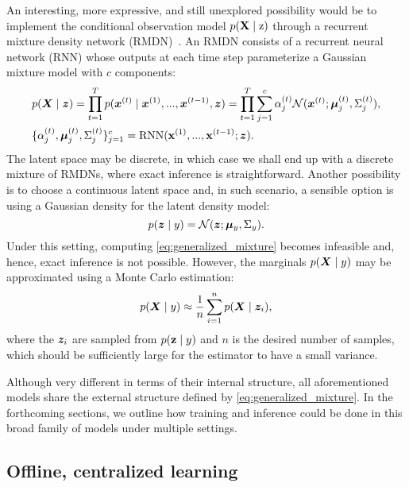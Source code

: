 An interesting, more expressive, and still unexplored possibility would be to implement the conditional observation model $p({\mathbf{X}} \mid {\textnormal{z}})$ through a recurrent mixture density network (RMDN)~\cite{Bishop1994, Graves2013, Bazzani2016}. An RMDN consists of a recurrent neural network (RNN) whose outputs at each time step parameterize a Gaussian mixture model with $c$ components:
\begin{align}
    & p({\bm{X}} \mid {\bm{z}}) = \prod_{t=1}^T p({\bm{x}}^{(t)} \mid {\bm{x}}^{(1)}, ..., {\bm{x}}^{(t-1)}, {\bm{z}}) = \prod_{t=1}^T \sum_{j=1}^c \alpha_j^{(t)} \mathcal{N}({\bm{x}}^{(t)} ; {\bm{\mu}}_j^{(t)}, \Sigma_j^{(t)}),\\
    & \lbrace \alpha_j^{(t)}, {\bm{\mu}}_j^{(t)}, \Sigma_j^{(t)} \rbrace_{j=1}^c = \text{RNN}({\mathbf{x}}^{(1)}, ..., {\mathbf{x}}^{(t-1)}; {\bm{z}}).
\end{align}
The latent space may be discrete, in which case we shall end up with a discrete mixture of RMDNs, where exact inference is straightforward. Another possibility is to choose a continuous latent space and, in such scenario, a sensible option is using a Gaussian density for the latent density model:
\begin{equation}
    p({\bm{z}} \mid y) = \mathcal{N}({\bm{z}} ; {\bm{\mu}}_y, \Sigma_y).
\end{equation}
Under this setting, computing \eqref{eq:generalized_mixture} becomes infeasible and, hence, exact inference is not possible. However, the marginals $p({\bm{X}} \mid y)$ may be approximated using a Monte Carlo estimation:
\begin{equation}
    p({\bm{X}} \mid y) \approx \frac{1}{n}\sum_{i=1}^n p({\bm{X}} \mid {\bm{z}}_i),
\end{equation}
where the ${\bm{z}}_i$ are sampled from $p({\mathbf{z}} \mid y)$ and $n$ is the desired number of samples, which should be sufficiently large for the estimator to have a small variance.

Although very different in terms of their internal structure, all aforementioned models share the external structure defined by \eqref{eq:generalized_mixture}. In the forthcoming sections, we outline how training and inference could be done in this broad family of models under multiple settings.

\subsection{Offline, centralized learning}
\label{sec:offline_learning}

